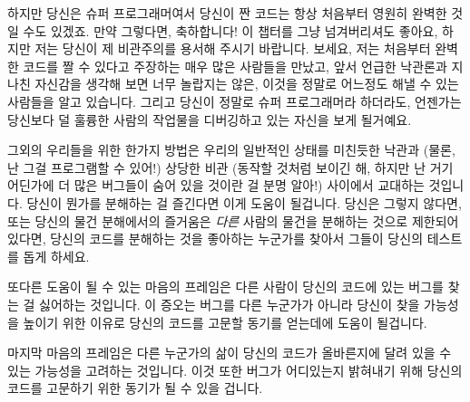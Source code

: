 하지만 당신은 슈퍼 프로그래머여서 당신이 짠 코드는 항상 처음부터 영원히 완벽한
것일 수도 있겠죠.
만약 그렇다면, 축하합니다!
이 챕터를 그냥 넘겨버리셔도 좋아요, 하지만 저는 당신이 제 비관주의를 용서해
주시기 바랍니다.
보세요, 저는 처음부터 완벽한 코드를 짤 수 있다고 주장하는 매우 많은 사람들을
만났고, 앞서 언급한 낙관론과 지나친 자신감을 생각해 보면 너무 놀랍지는 않은,
이것을 정말로 어느정도 해낼 수 있는 사람들을 알고 있습니다.
그리고 당신이 정말로 슈퍼 프로그래머라 하더라도, 언젠가는 당신보다 덜 훌륭한
사람의 작업물을 디버깅하고 있는 자신을 보게 될거예요.

그외의 우리들을 위한 한가지 방법은 우리의 일반적인 상태를 미친듯한 낙관과
(물론, 난 그걸 프로그램할 수 있어!) 상당한 비관 (동작할 것처럼 보이긴 해,
하지만 난 거기 어딘가에 더 많은 버그들이 숨어 있을 것이란 걸 분명 알아!)
사이에서 교대하는 것입니다.
당신이 뭔가를 분해하는 걸 즐긴다면 이게 도움이 될겁니다.
당신은 그렇지 않다면, 또는 당신의 물건 분해에서의 즐거움은 \emph{다른} 사람의
물건을 분해하는 것으로 제한되어 있다면, 당신의 코드를 분해하는 것을 좋아하는
누군가를 찾아서 그들이 당신의 테스트를 돕게 하세요.

또다른 도움이 될 수 있는 마음의 프레임은 다른 사람이 당신의 코드에 있는 버그를
찾는 걸 싫어하는 것입니다.
이 증오는 버그를 다른 누군가가 아니라 당신이 찾을 가능성을 높이기 위한 이유로
당신의 코드를 고문할 동기를 얻는데에 도움이 될겁니다.

마지막 마음의 프레임은 다른 누군가의 삶이 당신의 코드가 올바른지에 달려 있을 수
있는 가능성을 고려하는 것입니다.
이것 또한 버그가 어디있는지 밝혀내기 위해 당신의 코드를 고문하기 위한 동기가 될
수 있을 겁니다.

